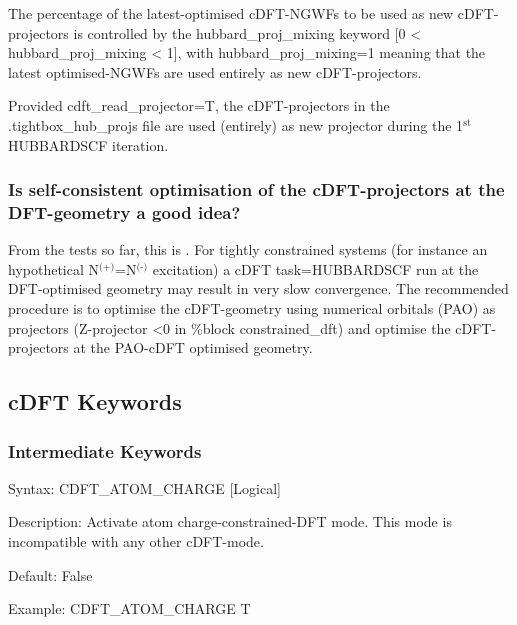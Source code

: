 \documentclass[letterpaper,10pt,english]{sphinxmanual}
\begin{document}
The percentage of the latest-optimised cDFT-NGWFs to be used as new
cDFT-projectors is controlled by the hubbard\_proj\_mixing keyword {[}0 \textless{}
\textbar{}hubbard\_proj\_mixing\textbar{} \textless{} 1{]}, with hubbard\_proj\_mixing=1 meaning
that the latest optimised-NGWFs are used entirely as new
cDFT-projectors.

 Provided cdft\_read\_projector=T, the cDFT-projectors in the
.tightbox\_hub\_projs file are used (entirely) as new projector during
the 1$^{\text{st}}$ HUBBARDSCF iteration.


\subsubsection{Is self-consistent optimisation of the cDFT-projectors at the DFT-geometry a good idea?}
\label{\detokenize{cDFT:is-self-consistent-optimisation-of-the-cdft-projectors-at-the-dft-geometry-a-good-idea}}
From the tests so far, this is . For tightly
constrained systems (for instance an hypothetical
N$^{\text{(+)}}$=N$^{\text{(-)}}$ excitation) a cDFT task=HUBBARDSCF run at
the DFT-optimised geometry may result in very slow convergence. The
recommended procedure is to  optimise the cDFT-geometry using
numerical orbitals (PAO) as projectors (Z-projector \textless{}0 in \%block
constrained\_dft) and  optimise the cDFT-projectors at the
PAO-cDFT optimised geometry.


\subsection{cDFT Keywords}
\label{\detokenize{cDFT:cdft-keywords}}

\subsubsection{Intermediate Keywords}
\label{\detokenize{cDFT:intermediate-keywords}}

Syntax: CDFT\_ATOM\_CHARGE {[}Logical{]}

Description: Activate atom charge-constrained-DFT mode. This mode is
incompatible with any other cDFT-mode.

Default: False

Example: CDFT\_ATOM\_CHARGE T

\end{document}
